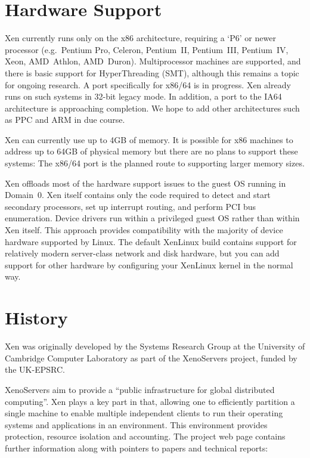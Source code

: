 \section{Hardware Support}

Xen currently runs only on the x86 architecture, requiring a `P6' or
newer processor (e.g.\ Pentium Pro, Celeron, Pentium~II, Pentium~III,
Pentium~IV, Xeon, AMD~Athlon, AMD~Duron).  Multiprocessor machines are
supported, and there is basic support for HyperThreading (SMT),
although this remains a topic for ongoing research. A port
specifically for x86/64 is in progress. Xen already runs on such
systems in 32-bit legacy mode. In addition, a port to the IA64
architecture is approaching completion. We hope to add other
architectures such as PPC and ARM in due course.

Xen can currently use up to 4GB of memory.  It is possible for x86
machines to address up to 64GB of physical memory but there are no
plans to support these systems: The x86/64 port is the planned route
to supporting larger memory sizes.

Xen offloads most of the hardware support issues to the guest OS
running in Domain~0.  Xen itself contains only the code required to
detect and start secondary processors, set up interrupt routing, and
perform PCI bus enumeration.  Device drivers run within a privileged
guest OS rather than within Xen itself. This approach provides
compatibility with the majority of device hardware supported by Linux.
The default XenLinux build contains support for relatively modern
server-class network and disk hardware, but you can add support for
other hardware by configuring your XenLinux kernel in the normal way.


\section{History}

Xen was originally developed by the Systems Research Group at the
University of Cambridge Computer Laboratory as part of the XenoServers
project, funded by the UK-EPSRC\@.

XenoServers aim to provide a ``public infrastructure for global
distributed computing''. Xen plays a key part in that, allowing one to
efficiently partition a single machine to enable multiple independent
clients to run their operating systems and applications in an
environment. This environment provides protection, resource isolation
and accounting.  The project web page contains further information
along with pointers to papers and technical reports:


